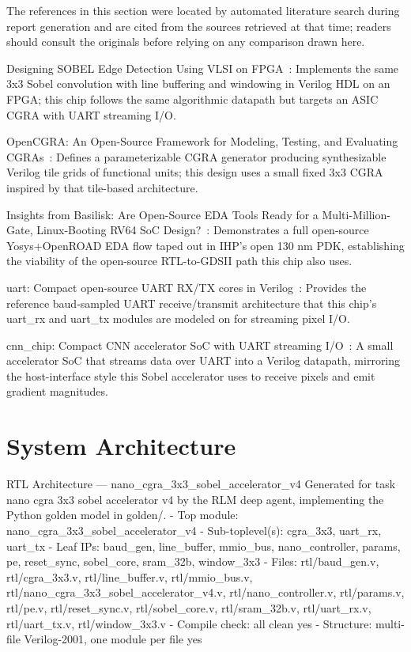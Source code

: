 \documentclass{ieeeaccess}
\begin{document}
The references in this section were located by automated literature search during report generation and are cited from the sources retrieved at that time; readers should consult the originals before relying on any comparison drawn here.

Designing SOBEL Edge Detection Using VLSI on FPGA~\cite{r1}: Implements the same 3x3 Sobel convolution with line buffering and windowing in Verilog HDL on an FPGA; this chip follows the same algorithmic datapath but targets an ASIC CGRA with UART streaming I/O.

OpenCGRA: An Open-Source Framework for Modeling, Testing, and Evaluating CGRAs~\cite{r2}: Defines a parameterizable CGRA generator producing synthesizable Verilog tile grids of functional units; this design uses a small fixed 3x3 CGRA inspired by that tile-based architecture.

Insights from Basilisk: Are Open-Source EDA Tools Ready for a Multi-Million-Gate, Linux-Booting RV64 SoC Design?~\cite{r3}: Demonstrates a full open-source Yosys+OpenROAD EDA flow taped out in IHP's open 130 nm PDK, establishing the viability of the open-source RTL-to-GDSII path this chip also uses.

uart: Compact open-source UART RX/TX cores in Verilog~\cite{r4}: Provides the reference baud-sampled UART receive/transmit architecture that this chip's uart\_rx and uart\_tx modules are modeled on for streaming pixel I/O.

cnn\_chip: Compact CNN accelerator SoC with UART streaming I/O~\cite{r5}: A small accelerator SoC that streams data over UART into a Verilog datapath, mirroring the host-interface style this Sobel accelerator uses to receive pixels and emit gradient magnitudes.

\section{System Architecture}
\label{sec:arch}
RTL Architecture --- nano\_cgra\_3x3\_sobel\_accelerator\_v4 Generated for task nano cgra 3x3 sobel accelerator v4 by the RLM deep agent, implementing the Python golden model in golden/. - Top module: nano\_cgra\_3x3\_sobel\_accelerator\_v4 - Sub-toplevel(s): cgra\_3x3, uart\_rx, uart\_tx - Leaf IPs: baud\_gen, line\_buffer, mmio\_bus, nano\_controller, params, pe, reset\_sync, sobel\_core, sram\_32b, window\_3x3 - Files: rtl/baud\_gen.v, rtl/cgra\_3x3.v, rtl/line\_buffer.v, rtl/mmio\_bus.v, rtl/nano\_cgra\_3x3\_sobel\_accelerator\_v4.v, rtl/nano\_controller.v, rtl/params.v, rtl/pe.v, rtl/reset\_sync.v, rtl/sobel\_core.v, rtl/sram\_32b.v, rtl/uart\_rx.v, rtl/uart\_tx.v, rtl/window\_3x3.v - Compile check: all clean yes - Structure: multi-file Verilog-2001, one module per file yes
\end{document}

